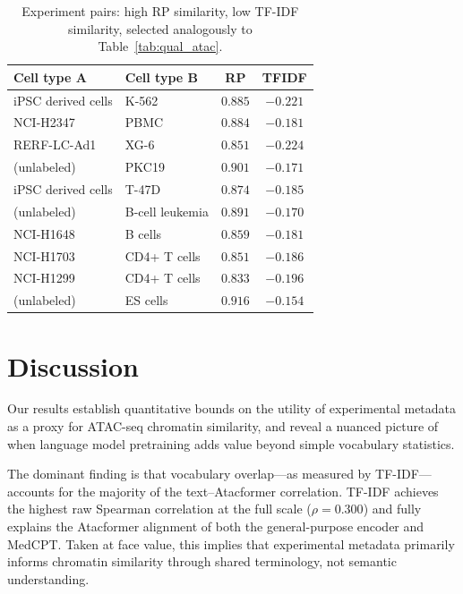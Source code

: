 \documentclass[conference]{IEEEtran}
\begin{document}
\begin{table}[!t]
  \centering
  \footnotesize
  \caption{Experiment pairs: high RP similarity, low TF-IDF similarity,
  selected analogously to Table~\ref{tab:qual_atac}.}
  \label{tab:qual_rp}
  \setlength{\tabcolsep}{4pt}
  \begin{tabular}{llcc}
    \toprule
    Cell type A & Cell type B & RP & TFIDF \\
    \midrule
    iPSC derived cells & K-562           & $0.885$ & $-0.221$ \\
    NCI-H2347          & PBMC            & $0.884$ & $-0.181$ \\
    RERF-LC-Ad1        & XG-6            & $0.851$ & $-0.224$ \\
    (unlabeled)        & PKC19           & $0.901$ & $-0.171$ \\
    iPSC derived cells & T-47D           & $0.874$ & $-0.185$ \\
    (unlabeled)        & B-cell leukemia & $0.891$ & $-0.170$ \\
    NCI-H1648          & B cells         & $0.859$ & $-0.181$ \\
    NCI-H1703          & CD4+ T cells    & $0.851$ & $-0.186$ \\
    NCI-H1299          & CD4+ T cells    & $0.833$ & $-0.196$ \\
    (unlabeled)        & ES cells        & $0.916$ & $-0.154$ \\
    \bottomrule
  \end{tabular}
\end{table}

\FloatBarrier
\section{Discussion}

Our results establish quantitative bounds on the utility of experimental
metadata as a proxy for ATAC-seq chromatin similarity, and reveal a nuanced
picture of when language model pretraining adds value beyond simple vocabulary
statistics.

The dominant finding is that vocabulary overlap---as measured by TF-IDF---
accounts for the majority of the text--Atacformer correlation. TF-IDF achieves
the highest raw Spearman correlation at the full scale ($\rho = 0.300$) and
fully explains the Atacformer alignment of both the general-purpose encoder and
MedCPT. Taken at face value, this implies that experimental metadata primarily
informs chromatin similarity through shared terminology, not semantic
understanding.
\end{document}
